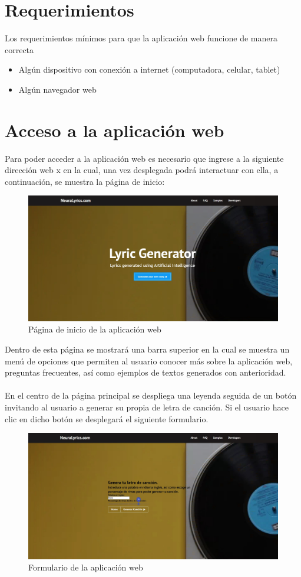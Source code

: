 \documentclass[12pt, a4paper, titlepage]{article}
\begin{document}
	\section{Requerimientos}
	Los requerimientos mínimos para que la aplicación web funcione de manera correcta
	\begin{itemize}
		\item Algún dispositivo con conexión a internet (computadora, celular, tablet)
		\item Algún navegador web
	\end{itemize}

	\section{Acceso a la aplicación web}
	Para poder acceder a la aplicación web es necesario que ingrese a la siguiente dirección web x en la cual, una vez desplegada podrá interactuar con ella, a continuación, se muestra la página de inicio:
	\begin{figure}[H] 
		\includegraphics[width=13.5cm]{./Imagenes/Capturas/pprincipal.jpg}
		\centering \caption{Página de inicio de la aplicación web}
	\end{figure}
	Dentro de esta página se mostrará una barra superior en la cual se muestra un menú de opciones que permiten al usuario conocer más sobre la aplicación web, preguntas frecuentes, así como ejemplos de textos generados con anterioridad.\\\\
	En el centro de la página principal se despliega una leyenda seguida de un botón invitando al usuario a generar su propia de letra de canción. Si el usuario hace clic en dicho botón se desplegará el siguiente formulario.
	\begin{figure}[H] 
		\includegraphics[width=13.5cm]{./Imagenes/Capturas/pformulario.jpg}
		\centering \caption{Formulario de la aplicación web}
	\end{figure}
\end{document}

